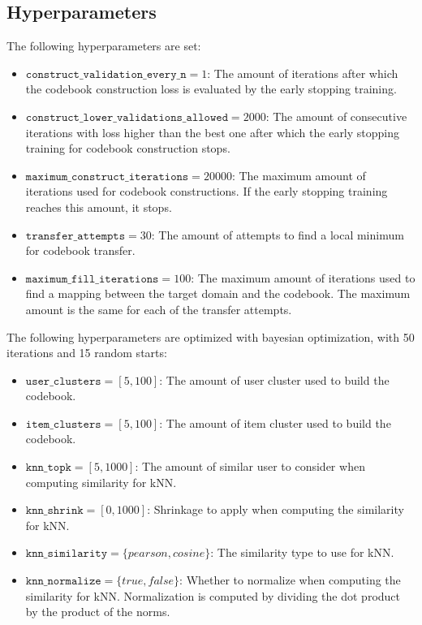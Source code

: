 \subsection{Hyperparameters}

The following hyperparameters are set:
\begin{itemize}
\item $\texttt{construct\_validation\_every\_n} = 1$: The amount of iterations after which the codebook construction loss is evaluated by the early stopping training.
\item $\texttt{construct\_lower\_validations\_allowed} = 2000$: The amount of consecutive iterations with loss higher than the best one after which the early stopping training for codebook construction stops.
\item $\texttt{maximum\_construct\_iterations} = 20000$: The maximum amount of iterations used for codebook constructions. If the early stopping training reaches this amount, it stops.
\item $\texttt{transfer\_attempts} = 30$: The amount of attempts to find a local minimum for codebook transfer.
\item $\texttt{maximum\_fill\_iterations} = 100$: The maximum amount of iterations used to find a mapping between the target domain and the codebook. The maximum amount is the same for each of the transfer attempts.
\end{itemize}
The following hyperparameters are optimized with bayesian optimization, with 50 iterations and 15 random starts:
\begin{itemize}
\item $\texttt{user\_clusters} = [5,100]$: The amount of user cluster used to build the codebook.
\item $\texttt{item\_clusters} = [5,100]$: The amount of item cluster used to build the codebook.
\item $\texttt{knn\_topk} = [5,1000]$: The amount of similar user to consider when computing similarity for kNN.
\item $\texttt{knn\_shrink} = [0,1000]$: Shrinkage to apply when computing the similarity for kNN.
\item $\texttt{knn\_similarity} = \{pearson,cosine\}$: The similarity type to use for kNN.
\item $\texttt{knn\_normalize} = \{true,false\}$: Whether to normalize when computing the similarity for kNN. Normalization is computed by dividing the dot product by the product of the norms.
\end{itemize}



